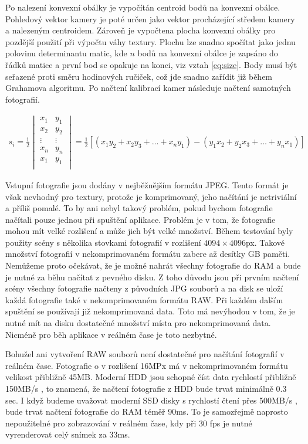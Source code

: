 \documentclass[11pt,twoside,a4paper]{book}
\begin{document}
Po nalezení konvexní obálky je vypočítán centroid bodů na konvexní obálce. Pohledový vektor kamery je poté určen jako vektor procházející středem kamery a nalezeným centroidem. Zároveň je vypočtena plocha konvexní obálky pro pozdější použití při výpočtu váhy textury. Plochu lze snadno spočítat jako jednu polovinu determinantu matic, kde $n$ bodů na konvexní obálce je zapsáno do řádků matice a první bod se opakuje na konci, viz vztah \ref{eq:size}. Body musí být seřazené proti směru hodinových ručiček, což jde snadno zařídit již během Grahamova algoritmu. Po načtení kalibrací kamer následuje načtení samotných fotografií.

\begin{align}
\label{eq:size}
s_i = \frac{1}{2} 
\begin{vmatrix}
x_1 & y_1 \\
x_2 & y_2 \\
\vdots & \vdots \\
x_n & y_n \\
x_1 & y_1 \\
\end{vmatrix}
= \frac{1}{2} [(x_1 y_2 + x_2 y_3 + \ldots + x_n y_1) - (y_1 x_2 + y_2 x_3 + \ldots + y_n x_1)]
\end{align}

Vstupní fotografie jsou dodány v nejběžnějším formátu JPEG. Tento formát je však nevhodný pro textury, protože je komprimovaný, jeho načítání je netriviální a příliš pomalé. To by ani nebyl takový problém, pokud bychom fotografie načítali pouze jednou při spuštění aplikace. Problém je v tom, že fotografie mohou mít velké rozlišení a může jich být velké množství. Během testování byly použity scény s několika stovkami fotografií v rozlišení $4094\times4096$px. Takové množství fotografií v nekomprimovaném formátu zabere až desítky GB paměti. Nemůžeme proto očekávat, že je možné nahrát všechny fotografie do RAM a bude je nutné za běhu načítat z pevného disku. Z toho důvodu jsou při prvním načtení scény všechny fotografie načteny z původních JPG souborů a na disk se uloží každá fotografie také v nekomprimovaném formátu RAW. Při každém dalším spuštění se používají již nekomprimovaná data. Toto má nevýhodou v tom, že je nutné mít na disku dostatečné množství místa pro nekomprimovaná data. Nicméně pro běh aplikace v reálném čase je toto nezbytné.

Bohužel ani vytvoření RAW souborů není dostatečné pro načítání fotografií v reálném čase. Fotografie o v rozlišení 16MPx má v nekomprimovaném formátu velikost přibližně 45MB. Moderní HDD jsou schopné číst data rychlostí přibližně 150MB/s \cite{hdd}, to znamená, že načtení fotografie z HDD bude trvat minimálně 0.3 sec. I když budeme uvažovat moderní SSD disky s rychlostí čtení přes 500MB/s \cite{ssd}, bude trvat načtení fotografie do RAM téměř 90ms. To je samozřejmě naprosto nepoužitelné pro zobrazování v reálném čase, kdy při 30 fps je nutné vyrenderovat celý snímek za 33ms.
\end{document}
